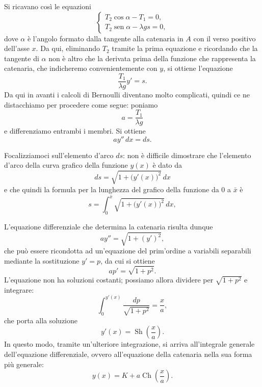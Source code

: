 \documentclass[11pt,a4paper]{article}
\newcommand{\Sh}{\operatorname{Sh}}
\newcommand{\Ch}{\operatorname{Ch}}
\newcommand{\sen}{\operatorname{sen}}
\begin{document}
\begin{center}
\end{center}

Si ricavano così le equazioni
\[
\begin{cases}
    T_2\cos\alpha-T_1=0,\\
    T_2\sen\alpha-\lambda gs=0,
\end{cases}
\]
dove $\alpha$ è l'angolo formato dalla tangente alla catenaria in $A$ con il verso positivo dell'asse $x$. Da qui, eliminando $T_2$ tramite la prima equazione e ricordando che la tangente di $\alpha$ non è altro che la derivata prima della funzione che rappresenta la catenaria, che indicheremo convenientemente con $y$, si ottiene l'equazione
\[
\frac{T_1}{\lambda g}y'=s.
\]
Da qui in avanti i calcoli di Bernoulli diventano molto complicati, quindi ce ne distacchiamo per procedere come segue: poniamo
\[
a=\frac{T_1}{\lambda g}
\]
e differenziamo entrambi i membri. Si ottiene
\[
ay''\,dx=ds.
\]

Focalizziamoci sull'elemento d'arco $ds$: non è difficile dimostrare che l'elemento d'arco della curva grafico della funzione $y(x)$ è dato da
\[
ds=\sqrt{1+\bigl(y'(x)\bigr)^2}\,dx
\]
e che quindi la formula per la lunghezza del grafico della funzione da $0$ a $\bar{x}$ è
\[
s=\int_0^{\bar{x}}\sqrt{1+\bigl(y'(x)\bigr)^2}\,dx,
\]

L'equazione differenziale che determina la catenaria risulta dunque
\begin{equation}
ay''=\sqrt{1+(y')^2},
\label{eq:catenaria}
\end{equation}
che può essere ricondotta ad un'equazione del prim'ordine a variabili separabili mediante la sostituzione $y'=p$, da cui si ottiene
\[
ap'=\sqrt{1+p^2}.
\]
L'equazione non ha soluzioni costanti; possiamo allora dividere per $\sqrt{1+p^2}$ e integrare:
\[
\int_0^{y'(x)}\frac{dp}{\sqrt{1+p^2}}=\frac{x}{a},
\]
che porta alla soluzione
\[
y'(x)=\Sh\!\left(\frac{x}{a}\right).
\]
In questo modo, tramite un'ulteriore integrazione, si arriva all'integrale generale dell'equazione differenziale, ovvero all'equazione della catenaria nella sua forma più generale:
\[
y(x)=K+a\Ch\!\left(\frac{x}{a}\right).
\]
\end{document}
